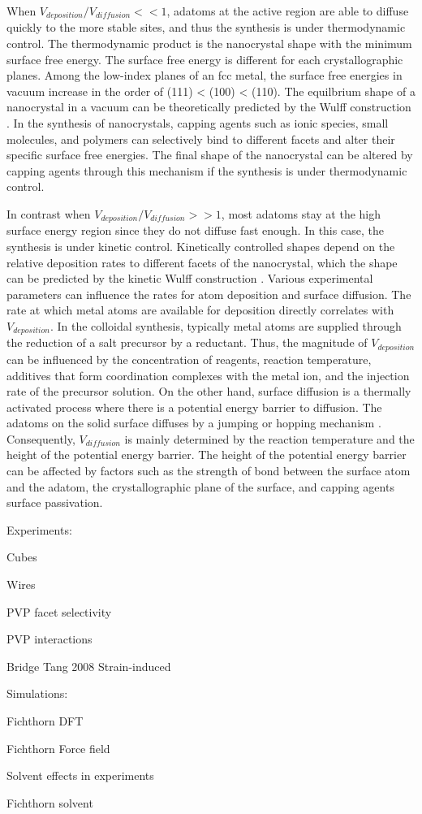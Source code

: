 When $V_{deposition}/V_{diffusion} << 1$, adatoms at the active region are able to diffuse quickly to the more stable sites, and thus the synthesis is under thermodynamic control.
The thermodynamic product is the nanocrystal shape with the minimum surface free energy.
The surface free energy is different for each crystallographic planes.
Among the low-index planes of an fcc metal, the surface free energies in vacuum increase in the order of (111) < (100) < (110).
The equilbrium shape of a nanocrystal in a vacuum can be theoretically predicted by the Wulff construction \cite{Bodineau_1999}.
In the synthesis of nanocrystals, capping agents such as ionic species, small molecules, and polymers can selectively bind to different facets and alter their specific surface free energies.
The final shape of the nanocrystal can be altered by capping agents through this mechanism if the synthesis is under thermodynamic control.

In contrast when $V_{deposition}/V_{diffusion} >> 1$, most adatoms stay at the high surface energy region since they do not diffuse fast enough.
In this case, the synthesis is under kinetic control.
Kinetically controlled shapes depend on the relative deposition rates to different facets of the nanocrystal, which the shape can be predicted by the kinetic Wulff construction \cite{Zhang_2006}.
Various experimental parameters can influence the rates for atom deposition and surface diffusion.
The rate at which metal atoms are available for deposition directly correlates with $V_{deposition}$.
In the colloidal synthesis, typically metal atoms are supplied through the reduction of a salt precursor by a reductant.
Thus, the magnitude of $V_{deposition}$ can be influenced by the concentration of reagents, reaction temperature, additives that form coordination complexes with the metal ion, and the injection rate of the precursor solution.
On the other hand, surface diffusion is a thermally activated process where there is a potential energy barrier to diffusion.
The adatoms on the solid surface diffuses by a jumping or hopping mechanism \cite{Tringides_1997}.
Consequently, $V_{diffusion}$ is mainly determined by the reaction temperature and the height of the potential energy barrier.
The height of the potential energy barrier can be affected by factors such as the strength of bond between the surface atom and the adatom, the crystallographic plane of the surface, and capping agents surface passivation.

Experiments:

Cubes

Wires

PVP facet selectivity

PVP interactions

Bridge Tang 2008 Strain-induced

Simulations:

Fichthorn DFT

Fichthorn Force field

Solvent effects in experiments

Fichthorn solvent